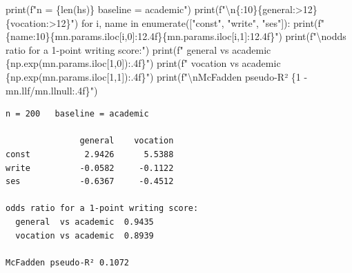 \documentclass[
  letterpaper,
  10pt,
  twoside,
  openright,
  numbers=noenddot,
  chapterprefix=true]{scrbook}
\newenvironment{Shaded}{}{}
\newcommand{\BuiltInTok}[1]{\textcolor[rgb]{0.84,0.23,0.29}{#1}}
\newcommand{\CharTok}[1]{\textcolor[rgb]{0.01,0.18,0.38}{#1}}
\newcommand{\ControlFlowTok}[1]{\textcolor[rgb]{0.84,0.23,0.29}{#1}}
\newcommand{\DecValTok}[1]{\textcolor[rgb]{0.00,0.36,0.77}{#1}}
\newcommand{\KeywordTok}[1]{\textcolor[rgb]{0.84,0.23,0.29}{#1}}
\newcommand{\NormalTok}[1]{\textcolor[rgb]{0.14,0.16,0.18}{#1}}
\newcommand{\OperatorTok}[1]{\textcolor[rgb]{0.14,0.16,0.18}{#1}}
\newcommand{\SpecialCharTok}[1]{\textcolor[rgb]{0.00,0.36,0.77}{#1}}
\newcommand{\SpecialStringTok}[1]{\textcolor[rgb]{0.01,0.18,0.38}{#1}}
\newcommand{\StringTok}[1]{\textcolor[rgb]{0.01,0.18,0.38}{#1}}
\begin{document}
\begin{Shaded}
\begin{Highlighting}[]
\BuiltInTok{print}\NormalTok{(}\SpecialStringTok{f"n = }\SpecialCharTok{\{}\BuiltInTok{len}\NormalTok{(hs)}\SpecialCharTok{\}}\SpecialStringTok{   baseline = academic"}\NormalTok{)}
\BuiltInTok{print}\NormalTok{(}\SpecialStringTok{f"}\CharTok{\textbackslash{}n}\SpecialCharTok{\{}\StringTok{\textquotesingle{}\textquotesingle{}}\SpecialCharTok{:10\}\{}\StringTok{\textquotesingle{}general\textquotesingle{}}\SpecialCharTok{:\textgreater{}12\}\{}\StringTok{\textquotesingle{}vocation\textquotesingle{}}\SpecialCharTok{:\textgreater{}12\}}\SpecialStringTok{"}\NormalTok{)}
\ControlFlowTok{for}\NormalTok{ i, name }\KeywordTok{in} \BuiltInTok{enumerate}\NormalTok{([}\StringTok{"const"}\NormalTok{, }\StringTok{"write"}\NormalTok{, }\StringTok{"ses"}\NormalTok{]):}
    \BuiltInTok{print}\NormalTok{(}\SpecialStringTok{f"}\SpecialCharTok{\{}\NormalTok{name}\SpecialCharTok{:10\}\{}\NormalTok{mn}\SpecialCharTok{.}\NormalTok{params}\SpecialCharTok{.}\NormalTok{iloc[i,}\DecValTok{0}\NormalTok{]}\SpecialCharTok{:12.4f\}\{}\NormalTok{mn}\SpecialCharTok{.}\NormalTok{params}\SpecialCharTok{.}\NormalTok{iloc[i,}\DecValTok{1}\NormalTok{]}\SpecialCharTok{:12.4f\}}\SpecialStringTok{"}\NormalTok{)}
\BuiltInTok{print}\NormalTok{(}\SpecialStringTok{f"}\CharTok{\textbackslash{}n}\SpecialStringTok{odds ratio for a 1{-}point writing score:"}\NormalTok{)}
\BuiltInTok{print}\NormalTok{(}\SpecialStringTok{f"  general  vs academic  }\SpecialCharTok{\{}\NormalTok{np}\SpecialCharTok{.}\NormalTok{exp(mn.params.iloc[}\DecValTok{1}\NormalTok{,}\DecValTok{0}\NormalTok{])}\SpecialCharTok{:.4f\}}\SpecialStringTok{"}\NormalTok{)}
\BuiltInTok{print}\NormalTok{(}\SpecialStringTok{f"  vocation vs academic  }\SpecialCharTok{\{}\NormalTok{np}\SpecialCharTok{.}\NormalTok{exp(mn.params.iloc[}\DecValTok{1}\NormalTok{,}\DecValTok{1}\NormalTok{])}\SpecialCharTok{:.4f\}}\SpecialStringTok{"}\NormalTok{)}
\BuiltInTok{print}\NormalTok{(}\SpecialStringTok{f"}\CharTok{\textbackslash{}n}\SpecialStringTok{McFadden pseudo{-}R² }\SpecialCharTok{\{}\DecValTok{1} \OperatorTok{{-}}\NormalTok{ mn}\SpecialCharTok{.}\NormalTok{llf}\OperatorTok{/}\NormalTok{mn}\SpecialCharTok{.}\NormalTok{llnull}\SpecialCharTok{:.4f\}}\SpecialStringTok{"}\NormalTok{)}
\end{Highlighting}
\end{Shaded}

\begin{verbatim}
n = 200   baseline = academic

               general    vocation
const           2.9426      5.5388
write          -0.0582     -0.1122
ses            -0.6367     -0.4512

odds ratio for a 1-point writing score:
  general  vs academic  0.9435
  vocation vs academic  0.8939

McFadden pseudo-R² 0.1072
\end{verbatim}
\end{document}
